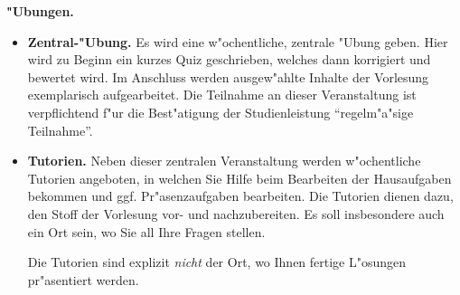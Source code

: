 \documentclass[a4,11pt]{article}
\begin{document}

{\bfseries "Ubungen.}
\begin{itemize}
\item \textbf{Zentral-"Ubung.} Es wird eine w"ochentliche, zentrale
  "Ubung geben. Hier wird zu Beginn ein kurzes Quiz geschrieben,
  welches dann korrigiert und bewertet wird. Im Anschluss werden
  ausgew"ahlte Inhalte der Vorlesung exemplarisch aufgearbeitet. Die
  Teilnahme an dieser Veranstaltung ist verpflichtend f"ur die
  Best"atigung der Studienleistung "`regelm"a"sige Teilnahme"'. 
\item \textbf{Tutorien.}
Neben dieser zentralen Veranstaltung werden w"ochentliche Tutorien
angeboten, in welchen Sie Hilfe beim Bearbeiten der Hausaufgaben
bekommen und ggf. Pr"asenzaufgaben bearbeiten.
Die Tutorien dienen dazu, den Stoff der Vorlesung vor- und
nachzubereiten. Es soll insbesondere auch ein Ort sein, wo
Sie all Ihre Fragen %
stellen.

Die Tutorien sind explizit {\em nicht} der Ort, wo Ihnen fertige
L"osungen pr"asentiert werden. 
% 
\end{itemize}

%
\bigskip
\end{document}
